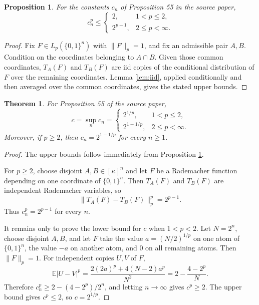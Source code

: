 \documentclass[11pt]{article}
\newtheorem{theorem}{Theorem}
\newtheorem{proposition}{Proposition}
\newcommand{\E}{\mathbb E}
\begin{document}
\begin{proposition}\label{prop:upper}
For the constants \(c_n\) of Proposition 55 in the source paper,
\[
 c_n^p \leq
 \begin{cases}
 2, & 1<p\leq2,\\
 2^{p-1}, & 2\leq p<\infty.
 \end{cases}
\]
\end{proposition}

\begin{proof}
Fix \(F\in L_p(\{0,1\}^n)\) with \(\|F\|_p=1\), and fix an admissible pair \(A,B\).  Condition on the coordinates belonging to \(A\cap B\).  Given those common coordinates, \(T_A(F)\) and \(T_B(F)\) are iid copies of the conditional distribution of \(F\) over the remaining coordinates.  Lemma \ref{lem:iid}, applied conditionally and then averaged over the common coordinates, gives the stated upper bounds.
\end{proof}

\begin{theorem}\label{thm:c}
For Proposition 55 of the source paper,
\[
 c=\sup_n c_n =
 \begin{cases}
 2^{1/p}, & 1<p\leq2,\\
 2^{1-1/p}, & 2\leq p<\infty.
 \end{cases}
\]
Moreover, if \(p\geq2\), then \(c_n=2^{1-1/p}\) for every \(n\geq1\).
\end{theorem}

\begin{proof}
The upper bounds follow immediately from Proposition \ref{prop:upper}.

For \(p\geq2\), choose disjoint \(A,B\in[\kappa]^n\) and let \(F\) be a Rademacher function depending on one coordinate of \(\{0,1\}^n\).  Then \(T_A(F)\) and \(T_B(F)\) are independent Rademacher variables, so
\[
 \|T_A(F)-T_B(F)\|_p^p=2^{p-1}.
\]
Thus \(c_n^p=2^{p-1}\) for every \(n\).

It remains only to prove the lower bound for \(c\) when \(1<p<2\).  Let \(N=2^n\), choose disjoint \(A,B\), and let \(F\) take the value \(a=(N/2)^{1/p}\) on one atom of \(\{0,1\}^n\), the value \(-a\) on another atom, and \(0\) on all remaining atoms.  Then \(\|F\|_p=1\).  For independent copies \(U,V\) of \(F\),
\[
\E|U-V|^p
 = \frac{2(2a)^p+4(N-2)a^p}{N^2}
 = 2-\frac{4-2^p}{N}.
\]
Therefore \(c_n^p\geq 2-(4-2^p)/2^n\), and letting \(n\to\infty\) gives \(c^p\geq2\).  The upper bound gives \(c^p\leq2\), so \(c=2^{1/p}\).
\end{proof}
\end{document}
